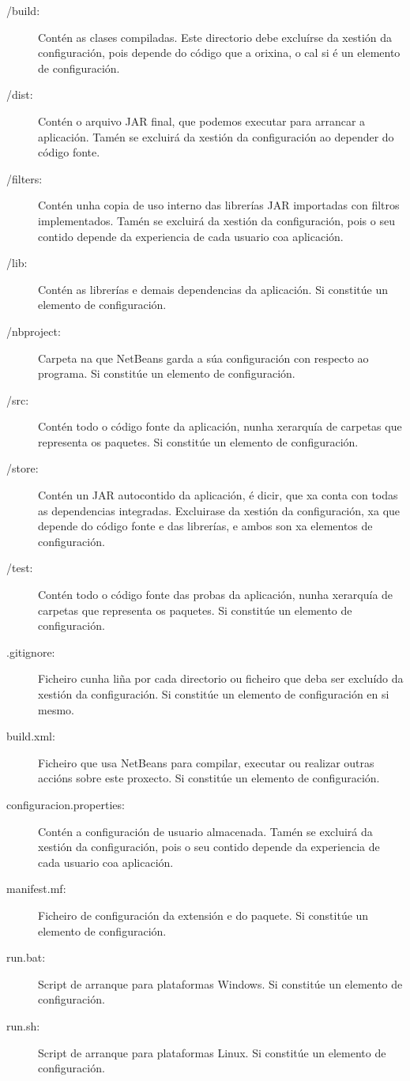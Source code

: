 \begin{description}
\item[/build:] \hfill
Contén as clases compiladas. Este directorio debe excluírse da xestión da configuración, pois depende do código que a orixina, o cal si é un elemento de configuración.
\item[/dist:] \hfill
Contén o arquivo JAR final, que podemos executar para arrancar a aplicación. Tamén se excluirá da xestión da configuración ao depender do código fonte.
\item[/filters:] \hfill
Contén unha copia de uso interno das librerías JAR importadas con filtros implementados. Tamén se excluirá da xestión da configuración, pois o seu contido depende da experiencia de cada usuario coa aplicación.
\item[/lib:] \hfill
Contén as librerías e demais dependencias da aplicación. Si constitúe un elemento de configuración.
\item[/nbproject:] \hfill
Carpeta na que NetBeans garda a súa configuración con respecto ao programa. Si constitúe un elemento de configuración.
\item[/src:] \hfill
Contén todo o código fonte da aplicación, nunha xerarquía de carpetas que representa os paquetes. Si constitúe un elemento de configuración.
\item[/store:] \hfill
Contén un JAR autocontido da aplicación, é dicir, que xa conta con todas as dependencias integradas. Excluirase da xestión da configuración, xa que depende do código fonte e das librerías, e ambos son xa elementos de configuración.
\item[/test:] \hfill
Contén todo o código fonte das probas da aplicación, nunha xerarquía de carpetas que representa os paquetes. Si constitúe un elemento de configuración.
\item[.gitignore:] \hfill
Ficheiro cunha liña por cada directorio ou ficheiro que deba ser excluído da xestión da configuración. Si constitúe un elemento de configuración en si mesmo.
\item[build.xml:] \hfill
Ficheiro que usa NetBeans para compilar, executar ou realizar outras accións sobre este proxecto. Si constitúe un elemento de configuración.
\item[configuracion.properties:] \hfill
Contén a configuración de usuario almacenada. Tamén se excluirá da xestión da configuración, pois o seu contido depende da experiencia de cada usuario coa aplicación.
\item[manifest.mf:] \hfill
Ficheiro de configuración da extensión e do paquete. Si constitúe un elemento de configuración.
\item[run.bat:] \hfill
Script de arranque para plataformas Windows. Si constitúe un elemento de configuración.
\item[run.sh:] \hfill
Script de arranque para plataformas Linux. Si constitúe un elemento de configuración.
\end{description}
 